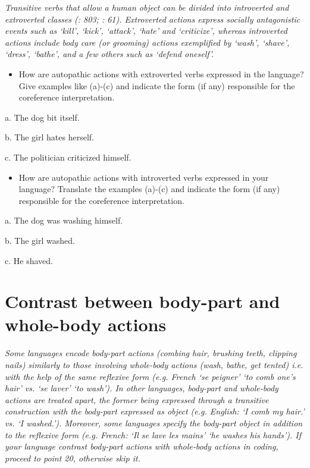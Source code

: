 \documentclass[output=paper]{langsci/langscibook} \label{AppendixA}
\begin{document}
\textit{Transitive verbs that allow a human object can be divided into introverted and extroverted classes (\citealt{Haiman1980}: 803; \citealt{KönigSiemund1999}: 61). Extroverted actions express socially antagonistic events such as ‘kill’, ‘kick’, ‘attack’, ‘hate’ and ‘criticize’, whereas introverted actions include body care (or grooming) actions exemplified by ‘wash’, ‘shave’, ‘dress’, ‘bathe’, and a few others such as ‘defend oneself’.}


\begin{itemize}
\item
How are autopathic actions with extroverted verbs expressed in the language? Give examples like (a)-(c) and indicate the form (if any) responsible for the coreference interpretation. 

\end{itemize}

a.  The dog bit itself. 



b.  The girl hates herself. 



c.  The politician criticized himself. 


\begin{itemize}
\item
How are autopathic actions with introverted verbs expressed in your language? Translate the examples (a)-(c) and indicate the form (if any) responsible for the coreference interpretation. 

\end{itemize}

a.  The dog was washing himself. 



b.  The girl washed. 



c.  He shaved. 


\section{Contrast between body-part and whole-body actions} 

\textit{Some languages encode body-part actions (combing hair, brushing teeth, clipping nails) similarly to those involving whole-body actions (wash, bathe, get tented) i.e. with the help of the same reflexive form (e.g. French ‘se peigner’ ‘to comb one’s hair’ vs. ‘se laver’ ‘to wash’). In other languages, body-part and whole-body actions are treated apart, the former being expressed through a transitive construction with the body-part expressed as object (e.g. English: ‘I comb my hair.’ vs. ‘I washed.’). Moreover, some languages specify the body-part object in addition to the reflexive form (e.g. French: ‘Il se lave les mains’ ‘he washes his hands’). If your language contrast body-part actions with whole-body actions in coding, proceed to point 20, otherwise skip it.}
\end{document}
